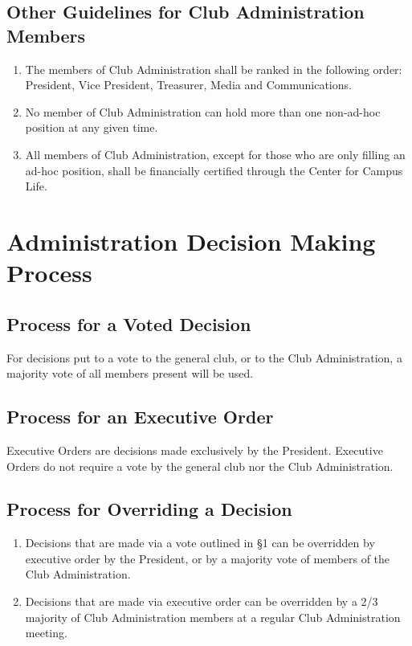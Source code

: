 \documentclass[english,11pt]{article}
\begin{document}
\subsection{Other Guidelines for Club Administration Members}

\begin{enumerate}[label=\Alph*.]
\item The members of Club Administration shall be ranked in the following order: President, Vice President, Treasurer, Media and Communications.
\item No member of Club Administration can hold more than one non-ad-hoc position at any given time.
\item All members of Club Administration, except for those who are only filling an ad-hoc position, shall be financially certified through the Center for Campus Life.
\end{enumerate}

\section{Administration Decision Making Process}

\subsection{Process for a Voted Decision}
For decisions put to a vote to the general club, or to the Club Administration, a majority vote of all members present will be used.

\subsection{Process for an Executive Order}
Executive Orders are decisions made exclusively by the President.
Executive Orders do not require a vote by the general club nor the Club Administration.

\subsection{Process for Overriding a Decision}
\begin{enumerate}[label=\Alph*.]
\item Decisions that are made via a vote outlined in §1 can be overridden by executive order by the President, or by a majority vote of members of the Club Administration.
\item Decisions that are made via executive order can be overridden by a 2/3 majority of Club Administration members at a regular Club Administration meeting.
\end{enumerate}
\end{document}
